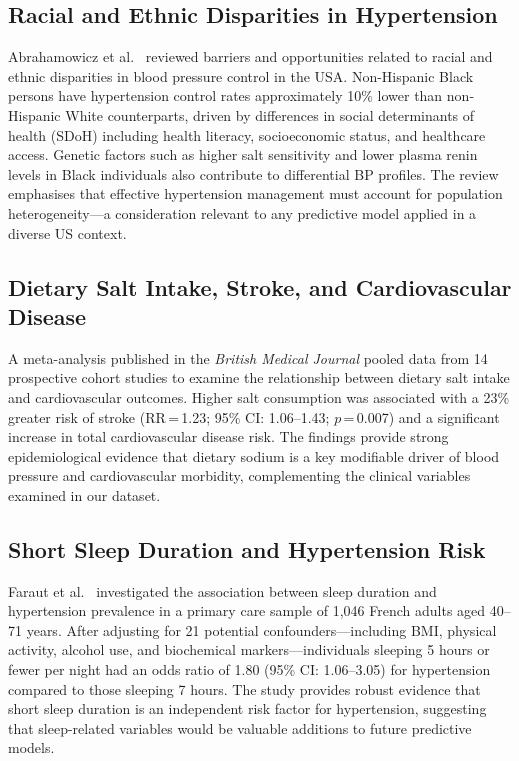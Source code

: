 ﻿\documentclass[conference]{IEEEtran}
\begin{document}
\subsection{Racial and Ethnic Disparities in Hypertension}

Abrahamowicz et al.\ \cite{abrahamowicz2023} reviewed barriers and opportunities
related to racial and ethnic disparities in blood pressure control in the USA.
Non-Hispanic Black persons have hypertension control rates approximately 10\%
lower than non-Hispanic White counterparts, driven by differences in social
determinants of health (SDoH) including health literacy, socioeconomic status,
and healthcare access. Genetic factors such as higher salt sensitivity and lower
plasma renin levels in Black individuals also contribute to differential BP
profiles. The review emphasises that effective hypertension management must
account for population heterogeneity---a consideration relevant to any predictive
model applied in a diverse US context.

\subsection{Dietary Salt Intake, Stroke, and Cardiovascular Disease}

A meta-analysis published in the \textit{British Medical Journal} \cite{bmj2009}
pooled data from 14 prospective cohort studies to examine the relationship between
dietary salt intake and cardiovascular outcomes. Higher salt consumption was
associated with a 23\% greater risk of stroke (RR\,=\,1.23; 95\% CI: 1.06--1.43;
$p$\,=\,0.007) and a significant increase in total cardiovascular disease risk.
The findings provide strong epidemiological evidence that dietary sodium is a key
modifiable driver of blood pressure and cardiovascular morbidity, complementing
the clinical variables examined in our dataset.

\subsection{Short Sleep Duration and Hypertension Risk}

Faraut et al.\ \cite{sleep2010} investigated the association between sleep
duration and hypertension prevalence in a primary care sample of 1{,}046 French
adults aged 40--71 years. After adjusting for 21 potential confounders---including
BMI, physical activity, alcohol use, and biochemical markers---individuals
sleeping 5 hours or fewer per night had an odds ratio of 1.80 (95\% CI:
1.06--3.05) for hypertension compared to those sleeping 7 hours. The study
provides robust evidence that short sleep duration is an independent risk factor
for hypertension, suggesting that sleep-related variables would be valuable
additions to future predictive models.
\end{document}

